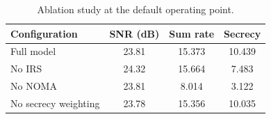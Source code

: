 \begin{table}[t]
\caption{Ablation study at the default operating point.}
\label{tab:ablation}
\centering
\begin{tabular}{lccc}
\hline
Configuration & SNR (dB) & Sum rate & Secrecy \\
\hline
Full model & 23.81 & 15.373 & 10.439 \\
No IRS & 24.32 & 15.664 & 7.483 \\
No NOMA & 23.81 & 8.014 & 3.122 \\
No secrecy weighting & 23.78 & 15.356 & 10.035 \\
\hline
\end{tabular}
\end{table}
